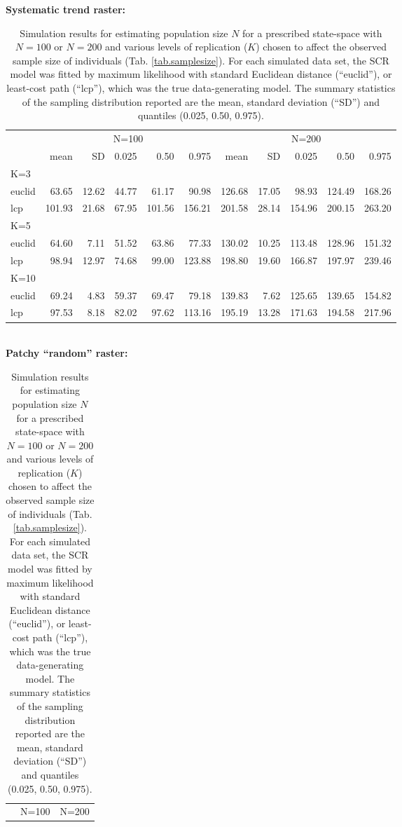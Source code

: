 \begin{table}[htp]
\label{tab.results1}
{\small
\caption{Simulation results for estimating population size $N$ for a prescribed state-space with
$N=100$ or $N=200$ and various levels of replication ($K$) chosen to affect the observed sample
size of individuals (Tab. \ref{tab.samplesize}). For each simulated
data set, the SCR model was fitted by maximum likelihood with
standard Euclidean distance (``euclid''), or least-cost path 
(``lcp''), which was the true data-generating model.
The summary statistics of the
sampling distribution reported are the mean, standard deviation
(``SD'') and quantiles (0.025, 0.50, 0.975).
}
{\bf Systematic trend raster:} \\
\begin{tabular}{l|rrrrr|rrrrr}
         & \multicolumn{5}{c}{N=100   } & \multicolumn{5}{c}{N=200  }  \\
         &   mean &  SD  & 0.025 & 0.50 & 0.975  & mean  & SD   & 0.025 & 0.50  & 0.975 \\ \hline
K=3      &        &      &       &      &        &       &      &       &       &       \\
euclid   &   63.65& 12.62& 44.77 & 61.17&  90.98 & 126.68& 17.05&  98.93& 124.49& 168.26 \\
lcp      &  101.93& 21.68& 67.95 &101.56& 156.21 & 201.58& 28.14& 154.96& 200.15& 263.20\\
K=5      &        &      &       &      &        &       &      &       &       &        \\
euclid   &  64.60 & 7.11 & 51.52 & 63.86&  77.33 & 130.02& 10.25& 113.48& 128.96& 151.32\\
lcp      &  98.94 &12.97 & 74.68 & 99.00& 123.88 & 198.80& 19.60& 166.87& 197.97& 239.46\\
K=10     &        &      &       &      &        &       &      &       &       &       \\
euclid   &  69.24 & 4.83 & 59.37 & 69.47&  79.18 & 139.83&  7.62& 125.65& 139.65& 154.82\\
lcp      &  97.53 & 8.18 & 82.02 & 97.62& 113.16 & 195.19& 13.28& 171.63& 194.58& 217.96\\ \hline
\end{tabular}
\\
{\bf Patchy ``random'' raster: } \\
\begin{tabular}{l|rrrrrrrrrr}
         & \multicolumn{5}{c}{N=100  } & \multicolumn{5}{c}{N=200   }  \\

\end{tabular}}
\end{table}

